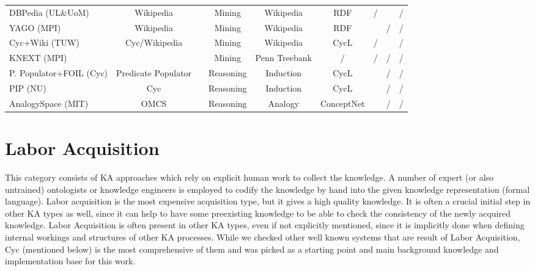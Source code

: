 \begin{landscape}
\begin{table}[htb]
\begin{adjustbox}{width=1.4\textwidth}
\begin{tabular}{lclcccccc}
		DBPedia (UL\&UoM) & Wikipedia & \parencite{Lehmann2015} & Mining & Wikipedia &  RDF & / &\checkmark & / \\
		YAGO (MPI) & Wikipedia & \parencite{Rebele2016} & Mining & Wikipedia &  RDF & \checkmark & / & / \\
		Cyc+Wiki (TUW) & Cyc/Wikipedia & \parencite{Medelyan2008} & Mining & Wikipedia &  CycL & / &\checkmark & / \\
		KNEXT (MPI) & \ & \parencite{Schubert2002} & Mining & Penn Treebank &  / & / & / & / \\
	    P. Populator+FOIL (Cyc) & Predicate Populator & \parencite{Witbrock2005} & Reasoning & Induction &  CycL & \checkmark & / & / \\
	    PIP (NU) & Cyc & \parencite{Sharma2010} & Reasoning & Induction &  CycL & \checkmark & / & / \\
	    AnalogySpace (MIT) & OMCS & \parencite{Speer2008} & Reasoning & Analogy &  ConceptNet & \checkmark & / & / \\
		\hline
	\end{tabular}
	\end{adjustbox}
\end{table}
\end{landscape}

\section{Labor Acquisition}
\label{section:labouracquisition}
This category consists of KA approaches which rely on explicit human work to 
collect the knowledge. A number of expert (or also untrained) ontologists or 
knowledge engineers is employed to codify the knowledge by hand into the given 
knowledge representation (formal language). Labor acquisition is the most 
expensive acquisition type, but it gives a high quality knowledge. It is often a
crucial initial step in other KA types as well, since it can help to have some 
preexisting knowledge to be able to check the consistency of the newly acquired
knowledge. Labor Acquisition is often present in other KA types, even if not 
explicitly mentioned, since it is implicitly done when defining internal 
workings and structures of other KA processes. While we checked other well 
known systems that are result of Labor Acquisition, Cyc (mentioned below) is 
the most comprehensive of them and was picked as a starting point and main 
background knowledge and implementation base for this work.

